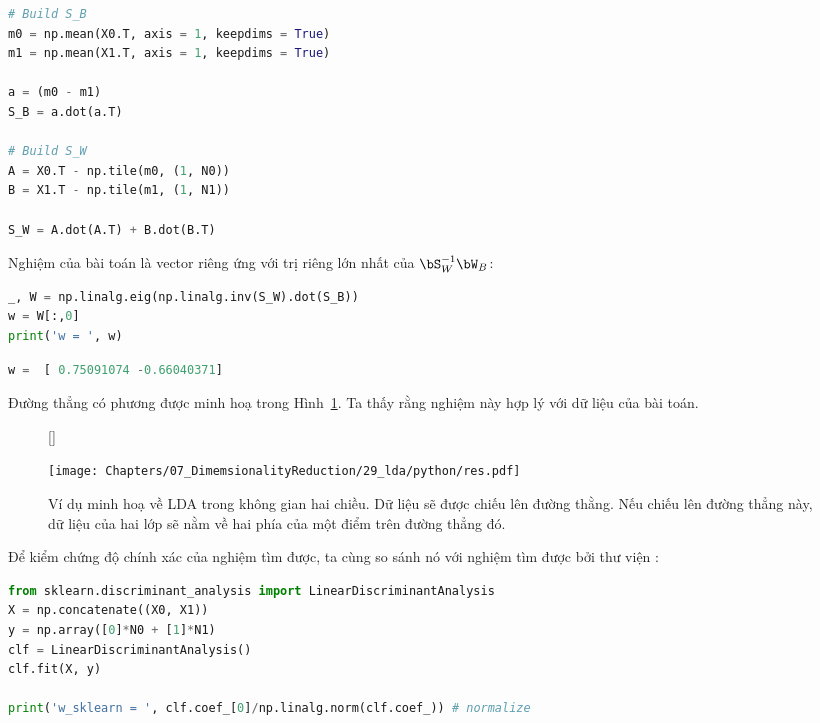 \begin{lstlisting}[language=Python]
# Build S_B 
m0 = np.mean(X0.T, axis = 1, keepdims = True) 
m1 = np.mean(X1.T, axis = 1, keepdims = True) 
 
a = (m0 - m1) 
S_B = a.dot(a.T) 
 
# Build S_W 
A = X0.T - np.tile(m0, (1, N0)) 
B = X1.T - np.tile(m1, (1, N1)) 
 
S_W = A.dot(A.T) + B.dot(B.T) 
\end{lstlisting}
Nghiệm của bài toán là vector riêng ứng với trị riêng lớn nhất của
$\bS_W^{-1}\bW_B$: %
\begin{lstlisting}[language=Python]
_, W = np.linalg.eig(np.linalg.inv(S_W).dot(S_B)) 
w = W[:,0] 
print('w = ', w)
\end{lstlisting}
\kq 
\begin{lstlisting}[language=Python]
w =  [ 0.75091074 -0.66040371]
\end{lstlisting}
 
Đường thẳng có phương  được minh hoạ trong Hình~\ref{fig:29_4}. Ta thấy rằng nghiệm này hợp lý với dữ liệu của bài toán. 
\begin{figure}[t]
    [\FBwidth]
    {\caption{ 
    Ví dụ minh hoạ về LDA trong không gian hai chiều. Dữ liệu sẽ được chiếu lên đường thằng. Nếu chiếu lên
    đường thẳng này, dữ liệu của hai lớp sẽ nằm về hai phía của một điểm
    trên đường thẳng đó.
    }
    \label{fig:29_4}}
    { %
    \texttt{[image: Chapters/07\_DimemsionalityReduction/29\_lda/python/res.pdf]}
    }
\end{figure}
 
Để kiểm chứng độ chính xác của nghiệm tìm được, ta cùng so sánh nó với nghiệm tìm được bởi thư viện :
\begin{lstlisting}[language=Python]
from sklearn.discriminant_analysis import LinearDiscriminantAnalysis
X = np.concatenate((X0, X1))
y = np.array([0]*N0 + [1]*N1)
clf = LinearDiscriminantAnalysis()
clf.fit(X, y)

print('w_sklearn = ', clf.coef_[0]/np.linalg.norm(clf.coef_)) # normalize
\end{lstlisting}
 
